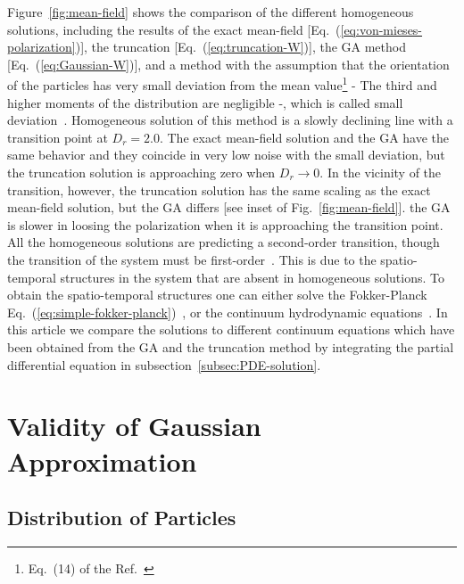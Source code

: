\documentclass[reprint,floatfix,amsmath,amssymb,aps,pre,showkeys,showpacs,superscriptaddress]{revtex4-1}
\newcommand{\req}[1]{Eq.~(\ref{#1})}
\begin{document}
Figure~\ref{fig:mean-field} shows the comparison of the different homogeneous solutions, including the results of the exact mean-field [\req{eq:von-mieses-polarization}], the truncation [\req{eq:truncation-W}], the GA method [\req{eq:Gaussian-W}], and a method with the assumption that the orientation of the particles has very small deviation from the mean value\footnote{Eq.~(14) of the Ref.~\cite{allaei2016}} - The third and higher moments of the distribution are negligible -, which is called small deviation~\cite{allaei2016}. Homogeneous solution of this method is a slowly declining line with a transition point at $D_r=2.0$. The exact mean-field solution and the GA have the same behavior and they coincide in very low noise with the small deviation, but the truncation solution is approaching zero when $D_r \to 0$. In the vicinity of the transition, however, the truncation solution has the same scaling as the exact mean-field solution, but the GA differs [see inset of Fig.~\ref{fig:mean-field}]. the GA is slower in loosing the polarization when it is approaching the transition point. All the homogeneous solutions are predicting a second-order transition, though the transition of the system must be first-order~\cite{Gregoire2004,nagy2007,Chate2008,Chate2008a,solon2015from,solon2015flocking,thuroff2014numerical}. This is due to the spatio-temporal structures in the system that are absent in homogeneous solutions. To obtain the spatio-temporal structures one can either solve the Fokker-Planck \req{eq:simple-fokker-planck}~\cite{thuroff2014numerical,thuroff2013critical}, or the continuum hydrodynamic equations~\cite{Peshkov2012,solon2015flocking,solon2015from,allaei2016}. In this article we compare the solutions to different continuum equations which have been obtained from the GA and the truncation method by integrating the partial differential equation in subsection~\ref{subsec:PDE-solution}.



\section{Validity of Gaussian Approximation}
\label{section:test}

\subsection{Distribution of Particles}
\end{document}
